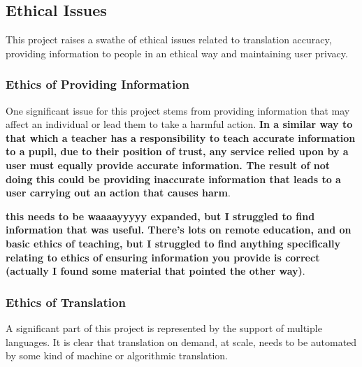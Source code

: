 \documentclass{article}
\begin{document}

\subsection{Ethical Issues}
This project raises a swathe of ethical issues related to translation accuracy, providing information to people in an ethical way and maintaining user privacy.

\subsubsection{Ethics of Providing Information}
One significant issue for this project stems from providing information that may affect an individual or lead them to take a harmful action.  {\bf In a similar way to that which a teacher has a responsibility to teach accurate information to a pupil, due to their position of trust, any service relied upon by a user must equally provide accurate information.  The result of not doing this could be providing inaccurate information that leads to a user carrying out an action that causes harm}.%


{\bf this needs to be waaaayyyyy expanded, but I struggled to find information that was useful.  There's lots on remote education, and on basic ethics of teaching, but I struggled to find anything specifically relating to ethics of ensuring information you provide is correct (actually I found some material that pointed the other way)}.

\subsubsection{Ethics of Translation}
A significant part of this project is represented by the support of multiple languages.  It is clear that translation on demand, at scale, needs to be automated by some kind of machine or algorithmic translation.
\end{document}
